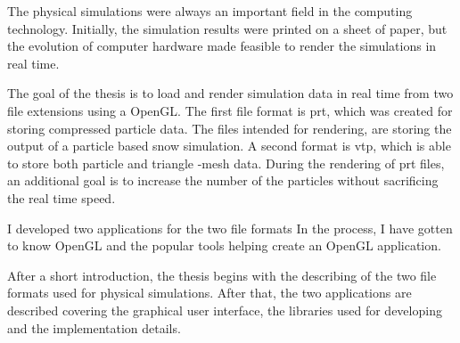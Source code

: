 The physical simulations were always an important field
in the computing technology.
Initially, the simulation results were printed on a sheet of paper,
but the evolution of computer hardware made feasible to
render the simulations in real time.

The goal of the thesis is
to load and render simulation data in real time 
from two file extensions using a OpenGL.
The first file format is prt, 
which was created for storing compressed particle data.
The files intended for rendering,
are storing the output of a particle based snow simulation.
A second format is vtp,
which is able to store both particle and triangle -mesh data.
During the rendering of prt files,
an additional goal is to increase the number
of the particles without sacrificing the real time speed.

I developed two applications for the two file formats 
In the process, 
I have gotten to know OpenGL 
and the popular tools helping create an OpenGL application.

After a short introduction, 
the thesis begins with the
describing of the two file formats 
used for physical simulations. 
After that, the two applications are 
described covering the graphical user interface, 
the libraries used for developing 
and the implementation details.











